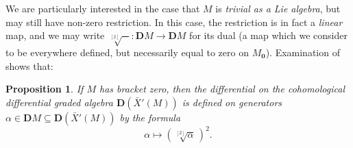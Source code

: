 \documentclass[11pt]{amsart} \renewcommand{\baselinestretch}{1.4}
\theoremstyle{plain}
\newtheorem{prop}[thm]{Proposition}
\theoremstyle{definition}
\newcommand{\DASH}{\mathrm{-}}
\renewcommand{\to}{\longrightarrow}
\newcommand{\citeBOX}[2][]{\cite[\mbox{#1}]{#2}}
\newcommand{\dualrestn}[1]{\sqrt[{[2]}]{#1}}
\renewcommand{\dualrestn}[1]{\sqrt[{\!\!\![2]}]{#1}}
\newcommand{\UEAX}{\bar{X}'}%
\newcommand{\dual}{\mathbf{D}}
\begin{document}
\begin{appendices}
We are particularly  interested in the case that $M$ is \emph{trivial as a Lie algebra}, but may still have non-zero restriction. In this case, the restriction is in fact a \emph{linear} map, and we may write $\dualrestn{\DASH}:\dual M\to \dual M$ for its dual (a map which we consider to be everywhere defined, but necessarily equal to zero on $M_{\textbf{0}}$). Examination of  \citeBOX[(6.19)]{MayRestLie.pdf} shows that:
\begin{prop}
\label{CEM for trivial lie bracket}
If $M$ has bracket zero, then the differential on the cohomological differential graded algebra $\dual(\UEAX(M))$ is defined on generators $\alpha\in \dual M\subseteq \dual(\UEAX(M))$ by the formula
\[\alpha\longmapsto (\!\sqrt[{[2]}]{\alpha}\,)^2.\]
\end{prop}
%


\end{appendices}
\end{document}
